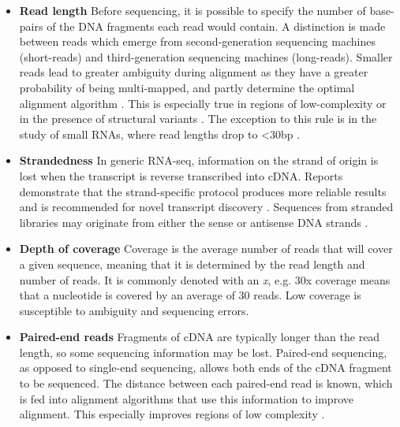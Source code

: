\begin{itemize}

\item[] \textbf{Read length} \hspace{0.15cm} Before sequencing, it is possible to specify the number of base-pairs of the DNA fragments each read would contain. A distinction is made between reads which emerge from second-generation sequencing machines (short-reads) and third-generation sequencing machines (long-reads). Smaller reads lead to greater ambiguity during alignment as they have a greater probability of being multi-mapped, and partly determine the optimal alignment algorithm \citep{albert2020biostar}. This is especially true in regions of low-complexity or in the presence of structural variants \citep{rhoads2015pacbio}. The exception to this rule is in the study of small RNAs, where read lengths drop to <30bp \citep{albert2020biostar}.

\item[] \textbf{Strandedness} \hspace{0.15cm} In generic RNA-seq, information on the strand of origin is lost when the transcript is reverse transcribed into cDNA. Reports demonstrate that the strand-specific protocol produces more reliable results \citep{zhao2015comparison} and is recommended for novel transcript discovery \citep{kukurba2015rna}. Sequences from stranded libraries may originate from either the sense or antisense DNA strands \citep{lu2012strand}.

\item[] \textbf{Depth of coverage} \hspace{0.15cm} Coverage is the average number of reads that will cover a given sequence, meaning that it is determined by the read length and number of reads. It is commonly denoted with an \textit{x}, e.g. 30x coverage means that a nucleotide is covered by an average of 30 reads. Low coverage is susceptible to ambiguity and sequencing errors.

\item[] \textbf{Paired-end reads} \hspace{0.15cm} Fragments of cDNA are typically longer than the read length, so some sequencing information may be lost. Paired-end sequencing, as opposed to single-end sequencing, allows both ends of the cDNA fragment to be sequenced. The distance between each paired-end read is known, which is fed into alignment algorithms that use this information to improve alignment. This especially improves regions of low complexity \citep{albert2020biostar}.


\end{itemize}
